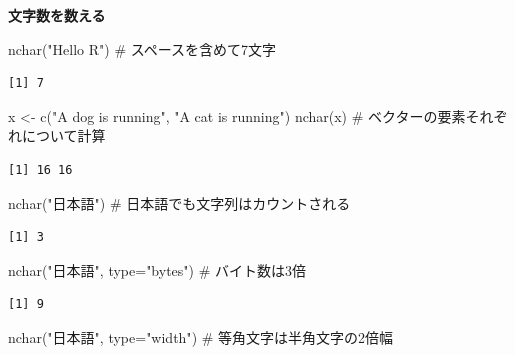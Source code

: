 \documentclass[
  letterpaper,
  DIV=11,
  numbers=noendperiod]{scrreprt}
\newenvironment{Shaded}{\begin{snugshade}}{\end{snugshade}}
\newcommand{\AttributeTok}[1]{\textcolor[rgb]{0.40,0.45,0.13}{#1}}
\newcommand{\CommentTok}[1]{\textcolor[rgb]{0.37,0.37,0.37}{#1}}
\newcommand{\FunctionTok}[1]{\textcolor[rgb]{0.28,0.35,0.67}{#1}}
\newcommand{\NormalTok}[1]{\textcolor[rgb]{0.00,0.23,0.31}{#1}}
\newcommand{\OtherTok}[1]{\textcolor[rgb]{0.00,0.23,0.31}{#1}}
\newcommand{\StringTok}[1]{\textcolor[rgb]{0.13,0.47,0.30}{#1}}
\begin{document}
\textbf{文字数を数える}

\begin{Shaded}
\begin{Highlighting}[]
\FunctionTok{nchar}\NormalTok{(}\StringTok{"Hello R"}\NormalTok{) }\CommentTok{\# スペースを含めて7文字}
\end{Highlighting}
\end{Shaded}

\begin{verbatim}
[1] 7
\end{verbatim}

\begin{Shaded}
\begin{Highlighting}[]
\NormalTok{x }\OtherTok{\textless{}{-}} \FunctionTok{c}\NormalTok{(}\StringTok{"A dog is running"}\NormalTok{, }\StringTok{"A cat is running"}\NormalTok{)}
\FunctionTok{nchar}\NormalTok{(x) }\CommentTok{\# ベクターの要素それぞれについて計算}
\end{Highlighting}
\end{Shaded}

\begin{verbatim}
[1] 16 16
\end{verbatim}

\begin{Shaded}
\begin{Highlighting}[]
\FunctionTok{nchar}\NormalTok{(}\StringTok{"日本語"}\NormalTok{) }\CommentTok{\# 日本語でも文字列はカウントされる}
\end{Highlighting}
\end{Shaded}

\begin{verbatim}
[1] 3
\end{verbatim}

\begin{Shaded}
\begin{Highlighting}[]
\FunctionTok{nchar}\NormalTok{(}\StringTok{"日本語"}\NormalTok{, }\AttributeTok{type=}\StringTok{"bytes"}\NormalTok{) }\CommentTok{\# バイト数は3倍}
\end{Highlighting}
\end{Shaded}

\begin{verbatim}
[1] 9
\end{verbatim}

\begin{Shaded}
\begin{Highlighting}[]
\FunctionTok{nchar}\NormalTok{(}\StringTok{"日本語"}\NormalTok{, }\AttributeTok{type=}\StringTok{"width"}\NormalTok{) }\CommentTok{\# 等角文字は半角文字の2倍幅}
\end{Highlighting}
\end{Shaded}
\end{document}
